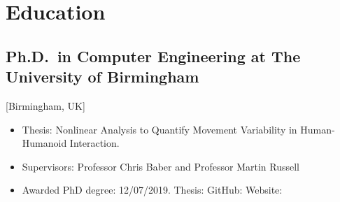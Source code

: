 \documentclass{mycv}
\begin{document}
\maketitle


\footnotesize

\section{Education}
\subsection{Ph.D.\ in Computer Engineering at The University of Birmingham}[Birmingham, UK]
\begin{itemize}[label={}]
  \item Thesis: Nonlinear Analysis to Quantify Movement Variability in Human-Humanoid Interaction. 
  \item Supervisors: Professor Chris Baber and  Professor Martin Russell
  \item	Awarded PhD degree: 12/07/2019. Thesis: \href{https://doi.org/10.5281/zenodo.3384145}{\faFilePdf}
	GitHub: \href{http://doi.org/10.5281/zenodo.3384281}{\faGithub*}
	Website: \href{https://mxochicale-phd.github.io/site/}{\faExternalLink*} 
\end{itemize}
\end{document}

